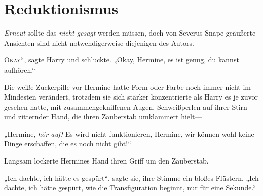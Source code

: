 \chapter{Reduktionismus}

\begin{chapterOpeningAuthorNote}
% 
\emph{Erneut} sollte das \emph{nicht gesagt} werden müssen, doch von Severus Snape geäußerte Ansichten sind nicht notwendigerweise diejenigen des Autors.
\end{chapterOpeningAuthorNote}

\lettrine[ante=„]{O}{kay}“, sagte Harry und schluckte. „Okay, Hermine, es ist genug, du kannst aufhören.“

Die weiße Zuckerpille vor Hermine hatte Form oder Farbe noch immer nicht im Mindesten verändert, trotzdem sie sich stärker konzentrierte als Harry es je zuvor gesehen hatte, mit zusammengekniffenen Augen, Schweißperlen auf ihrer Stirn und zitternder Hand, die ihren Zauberstab umklammert hielt—

„Hermine, \emph{hör auf!} Es wird nicht funktionieren, Hermine, wir können wohl keine Dinge erschaffen, die es noch nicht gibt!“

Langsam lockerte Hermines Hand ihren Griff um den Zauberstab.

„Ich dachte, ich hätte es gespürt“, sagte sie, ihre Stimme ein bloßes Flüstern. „Ich dachte, ich hätte gespürt, wie die Transfiguration beginnt, nur für eine Sekunde.“

